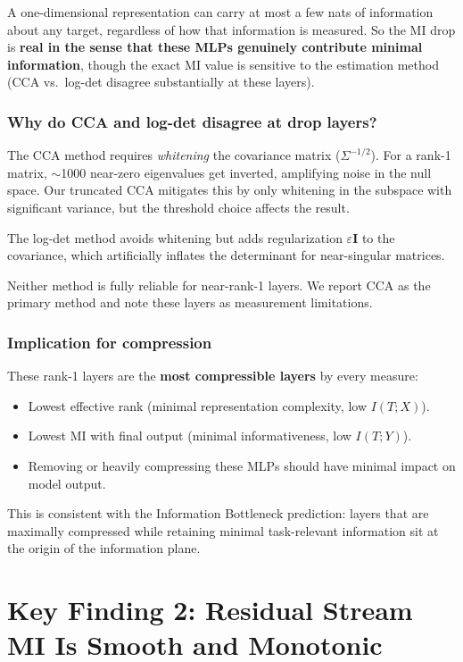 \documentclass[11pt]{article}
\begin{document}
A one-dimensional representation can carry at most a few nats of information about any target, regardless of how that information is measured. So the MI drop is \textbf{real in the sense that these MLPs genuinely contribute minimal information}, though the exact MI value is sensitive to the estimation method (CCA vs.\ log-det disagree substantially at these layers).

\subsubsection{Why do CCA and log-det disagree at drop layers?}

The CCA method requires \emph{whitening} the covariance matrix ($\Sigma^{-1/2}$). For a rank-1 matrix, $\sim$1000 near-zero eigenvalues get inverted, amplifying noise in the null space. Our truncated CCA mitigates this by only whitening in the subspace with significant variance, but the threshold choice affects the result.

The log-det method avoids whitening but adds regularization $\varepsilon \mathbf{I}$ to the covariance, which artificially inflates the determinant for near-singular matrices.

Neither method is fully reliable for near-rank-1 layers. We report CCA as the primary method and note these layers as measurement limitations.

\subsubsection{Implication for compression}

These rank-1 layers are the \textbf{most compressible layers} by every measure:
\begin{itemize}
    \item Lowest effective rank (minimal representation complexity, low $I(T;X)$).
    \item Lowest MI with final output (minimal informativeness, low $I(T;Y)$).
    \item Removing or heavily compressing these MLPs should have minimal impact on model output.
\end{itemize}
This is consistent with the Information Bottleneck prediction: layers that are maximally compressed while retaining minimal task-relevant information sit at the origin of the information plane.

\section{Key Finding 2: Residual Stream MI Is Smooth and Monotonic}
\end{document}
